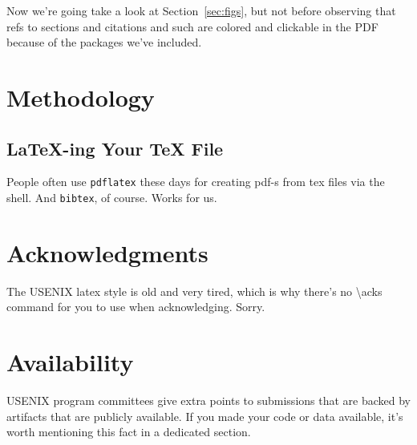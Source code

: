 \documentclass[letterpaper,twocolumn,10pt]{article}
\begin{document}
Now we're going take a look at Section~\ref{sec:figs}, but not before
observing that refs to sections and citations and such are colored and
clickable in the PDF because of the packages we've included.

\section{Methodology}
\label{sec:methodology}




\subsection{LaTeX-ing Your TeX File}

People often use \texttt{pdflatex} these days for creating pdf-s from
tex files via the shell. And \texttt{bibtex}, of course. Works for us.

\section*{Acknowledgments}

The USENIX latex style is old and very tired, which is why
there's no \textbackslash{}acks command for you to use when
acknowledging. Sorry.

\section*{Availability}

USENIX program committees give extra points to submissions that are
backed by artifacts that are publicly available. If you made your code
or data available, it's worth mentioning this fact in a dedicated
section.




\end{document}
